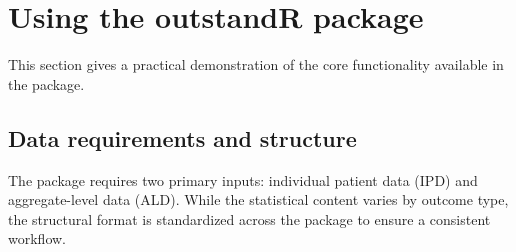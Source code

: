 \documentclass[article]{jss}
\begin{document}



\section{Using the outstandR package}
\label{sec:examples}
This section gives a practical demonstration of the core functionality available in the package.

\subsection{Data requirements and structure} \label{sec:data-req}
The  package requires two primary inputs: individual patient data (IPD) and aggregate-level data (ALD). While the statistical content varies by outcome type, the structural format is standardized across the package to ensure a consistent workflow.
\end{document}
